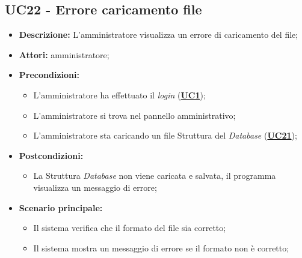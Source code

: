 \subsection{UC22 - Errore caricamento file}
\label{sec:UC22}
\begin{itemize}
	\item \textbf{Descrizione:} L’amministratore visualizza un errore di caricamento del file;
	\item \textbf{Attori:} amministratore;
	\item \textbf{Precondizioni:} 
	\begin{itemize}
		\item L’amministratore ha effettuato il \textit{login} (\hyperref[sec:UC1]{\textbf{UC1}});
		\item L’amministratore si trova nel pannello amministrativo;
		\item L’amministratore sta caricando un file Struttura del \textit{Database} (\hyperref[sec:UC21]{\textbf{UC21}});
	\end{itemize}
	\item \textbf{Postcondizioni:} 
	\begin{itemize}
		\item La Struttura \textit{Database} non viene caricata e salvata, il programma visualizza un messaggio di errore;
	\end{itemize}
	\item \textbf{Scenario principale:} 
	\begin{itemize}
		\item Il sistema verifica che il formato del file sia corretto;
		\item Il sistema mostra un messaggio di errore se il formato non è corretto;
	\end{itemize}
\end{itemize}


